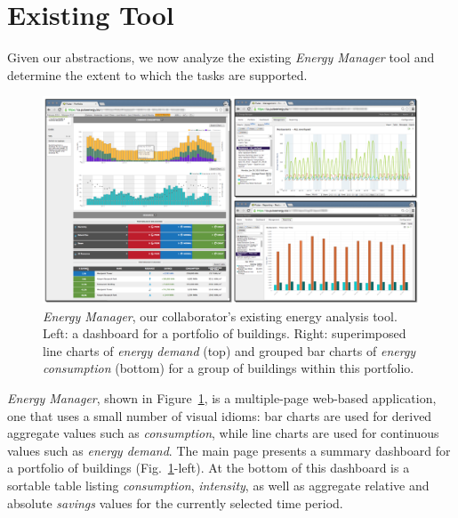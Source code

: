 \documentclass[journal]{vgtc}                %
\begin{document}

\section{Existing Tool}
\label{existing-tool}


Given our abstractions, we now analyze the existing {\it Energy Manager} tool and determine the extent to which the tasks are supported.

\begin{figure}[bp!]
    \vspace{-0.6cm}
	\centering
	\includegraphics[width=\textwidth]{figures/em.pdf}
	\vspace{-0.6cm}
	\caption{\textsl{Energy Manager}, our collaborator's existing energy analysis tool. Left: a dashboard for a portfolio of buildings. Right: superimposed line charts of \textsl{energy demand} (top) and grouped bar charts of \textsl{energy consumption} (bottom) for a group of buildings within this portfolio.}
	\label{fig:energy-manager}
\end{figure} 


{\it Energy Manager}, shown in Figure~\ref{fig:energy-manager}, is a multiple-page web-based application, one that uses a small number of visual idioms: bar charts are used for derived aggregate values such as {\it consumption}, while line charts are used for continuous values such as {\it energy demand}.
The main page presents a summary dashboard for a portfolio of buildings (Fig.~\ref{fig:energy-manager}-left). 
At the bottom of this dashboard is a sortable table listing {\it consumption}, {\it intensity}, as well as aggregate relative and absolute {\it savings} values for the currently selected time period. 
\end{document}
